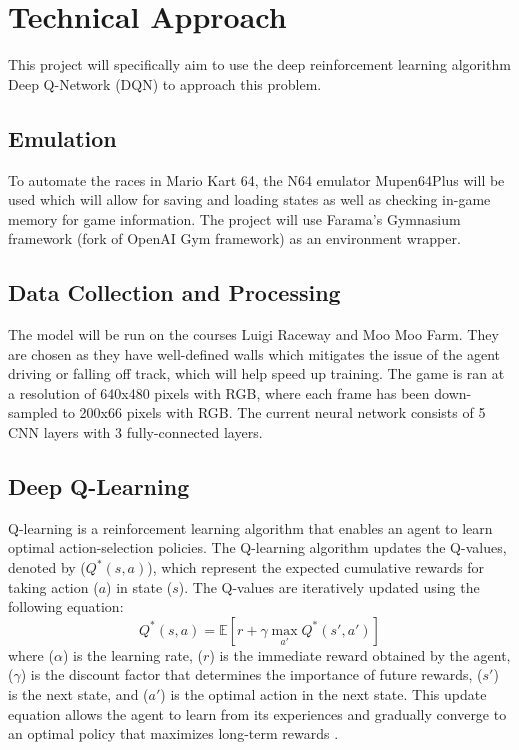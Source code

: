 \documentclass[10pt,twocolumn,letterpaper]{article}
\begin{document}
\section{Technical Approach}

This project will specifically aim to use the deep reinforcement learning algorithm Deep Q-Network (DQN) to approach this problem. 

\subsection{Emulation}
To automate the races in Mario Kart 64, the N64 emulator Mupen64Plus will be used which will allow for saving and loading states as well as checking in-game memory for game information. The project will use Farama's Gymnasium framework (fork of OpenAI Gym framework) \cite{towers_gymnasium_2023} as an environment wrapper.

\subsection{Data Collection and Processing}
The model will be run on the courses Luigi Raceway and Moo Moo Farm. They are chosen as they have well-defined walls which mitigates the issue of the agent driving or falling off track, which will help speed up training. The game is ran at a resolution of 640x480 pixels with RGB, where each frame has been down-sampled to 200x66 pixels with RGB. The current neural network consists of 5 CNN layers with 3 fully-connected layers.



\subsection{Deep Q-Learning}
Q-learning is a reinforcement learning algorithm that enables an agent to learn optimal action-selection policies. The Q-learning algorithm updates the Q-values, denoted by ($Q^\ast(s, a)$), which represent the expected cumulative rewards for taking action ($a$) in state ($s$). The Q-values are iteratively updated using the following equation: 
\begin{equation}Q^\ast(s, a) = \mathbb{E}[ r + \gamma \max_{a'} Q^\ast(s', a') ]\end{equation} 
where ($\alpha$) is the learning rate, ($r$) is the immediate reward obtained by the agent, ($\gamma$) is the discount factor that determines the importance of future rewards, ($s'$) is the next state, and ($a'$) is the optimal action in the next state. This update equation allows the agent to learn from its experiences and gradually converge to an optimal policy that maximizes long-term rewards \cite{watkins1992qlearning}.
\end{document}
